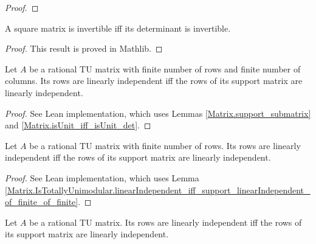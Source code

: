 \begin{proof}
    \leanok
    \SeeLean
\end{proof}

\begin{lemma}
    \label{Matrix.isUnit_iff_isUnit_det}
    \leanok
    A square matrix is invertible iff its determinant is invertible.
\end{lemma}

\begin{proof}
    \leanok
    This result is proved in Mathlib.
\end{proof}

\begin{lemma}
    \label{Matrix.IsTotallyUnimodular.linearIndependent_iff_support_linearIndependent_of_finite_of_finite}
    \leanok
    Let $A$ be a rational TU matrix with finite number of rows and finite number of columns.
    Its rows are linearly independent iff the rows of its support matrix are linearly independent.
\end{lemma}

\begin{proof}
    \leanok
    See Lean implementation, which uses Lemmas \ref{Matrix.support_submatrix} and \ref{Matrix.isUnit_iff_isUnit_det}.
\end{proof}

\begin{lemma}
    \label{Matrix.IsTotallyUnimodular.linearIndependent_iff_support_linearIndependent_of_finite}
    \leanok
    Let $A$ be a rational TU matrix with finite number of rows.
    Its rows are linearly independent iff the rows of its support matrix are linearly independent.
\end{lemma}

\begin{proof}
    \leanok
    See Lean implementation, which uses Lemma \ref{Matrix.IsTotallyUnimodular.linearIndependent_iff_support_linearIndependent_of_finite_of_finite}.
\end{proof}

\begin{lemma}
    \label{Matrix.IsTotallyUnimodular.linearIndependent_iff_support_linearIndependent}
    \leanok
    Let $A$ be a rational TU matrix.
    Its rows are linearly independent iff the rows of its support matrix are linearly independent.
\end{lemma}

